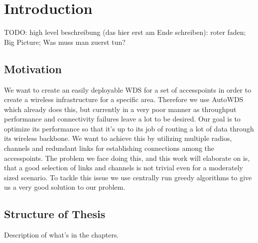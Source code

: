 \chapter{Introduction}
TODO: high level beschreibung (das hier erst am Ende schreiben): roter faden; Big Picture; Was muss man zuerst tun?
\section{Motivation}
  We want to create an easily deployable \ac{WDS} for a set of accesspoints in order to create a wireless infrastructure for a specific area.
  Therefore we use AutoWDS which already does this, but currently in a very poor manner as throughput performance 
  and connectivity failures leave a lot to be desired. Our goal is to optimize its performance so that it's up to its job of routing a lot of data through its wireless backbone.
  We want to achieve this by utilizing multiple radios, channels and redundant links for establishing connections among the accesspoints.
  The problem we face doing this, and this work will elaborate on is, that a good selection of links and channels is not trivial even for a moderately sized scenario.
  To tackle this issue we use centrally run greedy algorithms to give us a very good solution to our problem.
\section{Structure of Thesis}
Description of what's in the chapters.
